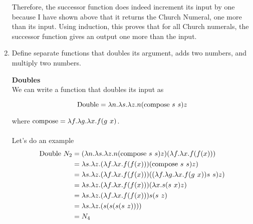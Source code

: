 \documentclass{article}
\begin{document}
\begin{enumerate}
    \bigskip
    
    Therefore, the successor function does indeed increment its input by one because I have shown above that it returns the Church Numeral, one more than its input. Using induction, this proves that for all Church numerals, the successor function gives an output one more than the input. \\
    
    \color{black}
    \newpage
    \item Define separate functions that doubles its argument, adds two numbers, and multiply two numbers.
    \color{blue}

    \Large \textbf{Doubles}\\
    \normalsize
    We can write a function that doubles its input as
    
    \[\text{Double} = \lambda n.\lambda s.\lambda z.n (\text{compose } s \hspace{0.125cm} s) z\]

    where \(\text{compose} = \lambda f.\lambda g.\lambda x.f (g \hspace{0.125cm} x)\).\\
    \\
    Let's do an example
    \begin{align}
        \text{Double } N_2
        &= (\lambda n.\lambda s.\lambda z.n (\text{compose } s \hspace{0.125cm} s) z) (\lambda f.\lambda x.f(f(x))) \\
        &= \lambda s.\lambda z.(\lambda f.\lambda x.f(f(x))) (\text{compose } s \hspace{0.125cm} s) z) \\
        &= \lambda s.\lambda z.(\lambda f.\lambda x.f(f(x))) ((\lambda f.\lambda g.\lambda x.f (g \hspace{0.125cm} x)) s \hspace{0.125cm} s) z) \\
        &= \lambda s.\lambda z.(\lambda f.\lambda x.f(f(x))) (\lambda x.s(s \hspace{0.125cm} x) z) \\
        &= \lambda s.\lambda z.(\lambda f.\lambda x.f(f(x))) s(s \hspace{0.125cm} z) \\
        &= \lambda s.\lambda z.(s(s(s(s \hspace{0.125cm} z)))) \\
        &= N_4
    \end{align}
    

\end{enumerate}
\end{document}
